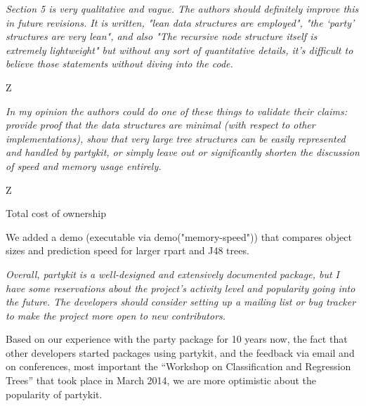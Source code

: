 \documentclass{article}
\begin{document}
\textit{
Section 5 is very qualitative and vague.  The authors should definitely
improve this in future revisions.  It is written, "lean data structures are
employed", "the `party' structures are very lean", and also "The recursive
node structure itself is extremely lightweight" but without any sort of
quantitative details, it's difficult to believe those statements without
diving into the code.}

Z

\textit{
In my opinion the authors could do one of these things to validate their
claims: provide proof that the data structures are minimal (with respect to
other implementations), show that very large tree structures can be easily
represented and handled by partykit, or simply leave out or significantly
shorten the discussion of speed and memory usage entirely.}

Z

Total cost of ownership

We added a demo (executable via demo("memory-speed")) that compares object
sizes and prediction speed for larger rpart and J48 trees.

\textit{
Overall, partykit is a well-designed and extensively documented package, but
I have some reservations about the project's activity level and popularity
going into the future.  The developers should consider setting up a mailing
list or bug tracker to make the project more open to new contributors.}

Based on our experience with the party package for 10 years now, the fact
that other developers started packages using partykit, and the feedback via
email and on conferences, most important the ``Workshop on Classification
and Regression Trees'' that took place in March 2014, we are more optimistic
about the popularity of partykit.



\end{document}
